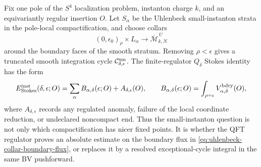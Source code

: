 \begin{controlledapproximation}
\label{ca:uhlenbeck-collar-boundary-flux-selection}
Fix one pole of the \(S^4\) localization problem, instanton charge \(k\), and
an equivariantly regular insertion \(O\).  Let \(S_\alpha\) be the Uhlenbeck
small-instanton strata in the pole-local compactification, and choose collars
\[
  (0,\epsilon_0)_\rho\times L_\alpha \longrightarrow
  \overline{\mathcal M}^{\,U}_{k,N}
\]
around the boundary faces of the smooth stratum.  Removing
\(\rho<\epsilon\) gives a truncated smooth integration cycle
\(\mathcal C_{\delta,\epsilon}^{\rm sm}\).  The finite-regulator \(Q_\delta\)
Stokes identity has the form
\begin{equation}
  E_{\rm Stokes}^{\rm inst}(\delta,\epsilon;O)
  =
  \sum_\alpha
  B_{\alpha,\delta}(\epsilon;O)
  + A_{\delta,\epsilon}(O),
  \qquad
  B_{\alpha,\delta}(\epsilon;O)
  =
  \int_{\rho=\epsilon}
  V_{\alpha,\delta}^{\rm bdry}(O),
  \label{eq:uhlenbeck-collar-boundary-flux}
\end{equation}
where \(A_{\delta,\epsilon}\) records any regulated anomaly, failure of the
local coordinate reduction, or undeclared noncompact end.  Thus the
small-instanton question is not only which compactification has nicer fixed
points.  It is whether the QFT regulator proves an absolute estimate on the
boundary flux in \eqref{eq:uhlenbeck-collar-boundary-flux}, or replaces it by
a resolved exceptional-cycle integral in the same BV pushforward.


\end{controlledapproximation}
